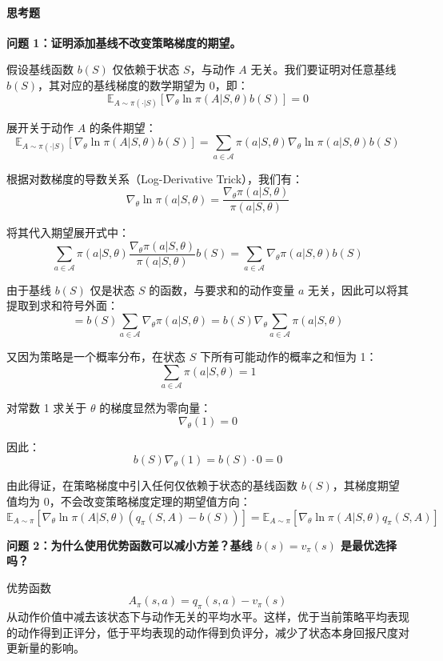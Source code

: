 \documentclass[11pt,a4paper,UTF8]{ctexart}
\numberwithin{figure}{section}
\numberwithin{table}{section}
\newcommand{\answerlabel}{%
  \par\smallskip\noindent{\heiti\bfseries 回答：}\quad}
\newcommand{\question}[1]{\par\smallskip\noindent\textbf{#1}\par}
\begin{document}
\paragraph{思考题}



\question{问题 1：证明添加基线不改变策略梯度的期望。}

\answerlabel
假设基线函数 $b(S)$ 仅依赖于状态 $S$，与动作 $A$ 无关。我们要证明对任意基线 $b(S)$，其对应的基线梯度的数学期望为 0，即：
$$\mathbb{E}_{A \sim \pi(\cdot|S)} \left[ \nabla_\theta \ln \pi(A|S, \theta) b(S) \right] = 0$$

展开关于动作 $A$ 的条件期望：
$$\mathbb{E}_{A \sim \pi(\cdot|S)} \left[ \nabla_\theta \ln \pi(A|S, \theta) b(S) \right] = \sum_{a \in \mathcal{A}} \pi(a|S, \theta) \nabla_\theta \ln \pi(a|S, \theta) b(S)$$

根据对数梯度的导数关系（Log-Derivative Trick），我们有：
$$\nabla_\theta \ln \pi(a|S, \theta) = \frac{\nabla_\theta \pi(a|S, \theta)}{\pi(a|S, \theta)}$$

将其代入期望展开式中：
$$\sum_{a \in \mathcal{A}} \pi(a|S, \theta) \frac{\nabla_\theta \pi(a|S, \theta)}{\pi(a|S, \theta)} b(S) = \sum_{a \in \mathcal{A}} \nabla_\theta \pi(a|S, \theta) b(S)$$

由于基线 $b(S)$ 仅是状态 $S$ 的函数，与要求和的动作变量 $a$ 无关，因此可以将其提取到求和符号外面：
$$= b(S) \sum_{a \in \mathcal{A}} \nabla_\theta \pi(a|S, \theta) = b(S) \nabla_\theta \sum_{a \in \mathcal{A}} \pi(a|S, \theta)$$

又因为策略是一个概率分布，在状态 $S$ 下所有可能动作的概率之和恒为 1：
$$\sum_{a \in \mathcal{A}} \pi(a|S, \theta) = 1$$

对常数 1 求关于 $\theta$ 的梯度显然为零向量：
$$\nabla_\theta (1) = 0$$

因此：
$$b(S) \nabla_\theta (1) = b(S) \cdot 0 = 0$$

由此得证，在策略梯度中引入任何仅依赖于状态的基线函数 $b(S)$，其梯度期望值均为 0，不会改变策略梯度定理的期望值方向：
$$\mathbb{E}_{A \sim \pi} \left[ \nabla_\theta \ln \pi(A|S, \theta) (q_\pi(S, A) - b(S)) \right] = \mathbb{E}_{A \sim \pi} \left[ \nabla_\theta \ln \pi(A|S, \theta) q_\pi(S, A) \right]$$

\question{问题 2：为什么使用优势函数可以减小方差？基线 $b(s)=v_\pi(s)$ 是最优选择吗？}

\answerlabel 优势函数
\[
A_\pi(s,a)=q_\pi(s,a)-v_\pi(s)
\]
从动作价值中减去该状态下与动作无关的平均水平。这样，优于当前策略平均表现的动作得到正评分，低于平均表现的动作得到负评分，减少了状态本身回报尺度对更新量的影响。
\end{document}
